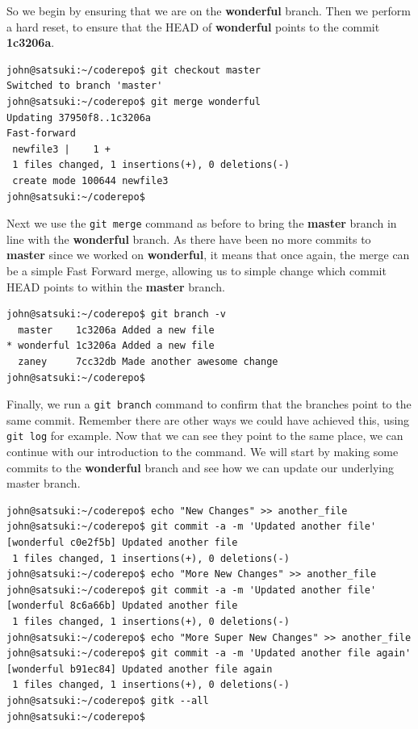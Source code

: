 So we begin by ensuring that we are on the \textbf{wonderful} branch.
Then we perform a hard reset, to ensure that the HEAD of \textbf{wonderful} points to the commit \textbf{1c3206a}.

\begin{Verbatim}
john@satsuki:~/coderepo$ git checkout master
Switched to branch 'master'
john@satsuki:~/coderepo$ git merge wonderful
Updating 37950f8..1c3206a
Fast-forward
 newfile3 |    1 +
 1 files changed, 1 insertions(+), 0 deletions(-)
 create mode 100644 newfile3
john@satsuki:~/coderepo$
\end{Verbatim}

Next we use the \texttt{git merge} command as before to bring the \textbf{master} branch in line with the \textbf{wonderful} branch.
As there have been no more commits to \textbf{master} since we worked on \textbf{wonderful}, it means that once again, the merge can be a simple Fast Forward merge, allowing us to simple change which commit HEAD points to within the \textbf{master} branch.

\begin{Verbatim}
john@satsuki:~/coderepo$ git branch -v
  master    1c3206a Added a new file
* wonderful 1c3206a Added a new file
  zaney     7cc32db Made another awesome change
john@satsuki:~/coderepo$
\end{Verbatim}

Finally, we run a \texttt{git branch} command to confirm that the branches point to the same commit.
Remember there are other ways we could have achieved this, using \texttt{git log} for example.
Now that we can see they point to the same place, we can continue with our introduction to the  command.
We will start by making some commits to the \textbf{wonderful} branch and see how we can update our underlying master branch.

\begin{Verbatim}
john@satsuki:~/coderepo$ echo "New Changes" >> another_file
john@satsuki:~/coderepo$ git commit -a -m 'Updated another file'
[wonderful c0e2f5b] Updated another file
 1 files changed, 1 insertions(+), 0 deletions(-)
john@satsuki:~/coderepo$ echo "More New Changes" >> another_file
john@satsuki:~/coderepo$ git commit -a -m 'Updated another file'
[wonderful 8c6a66b] Updated another file
 1 files changed, 1 insertions(+), 0 deletions(-)
john@satsuki:~/coderepo$ echo "More Super New Changes" >> another_file
john@satsuki:~/coderepo$ git commit -a -m 'Updated another file again'
[wonderful b91ec84] Updated another file again
 1 files changed, 1 insertions(+), 0 deletions(-)
john@satsuki:~/coderepo$ gitk --all
john@satsuki:~/coderepo$
\end{Verbatim}

